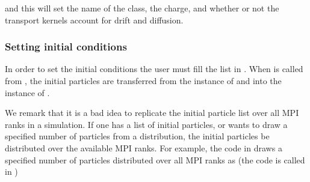 \documentclass[letterpaper,10pt,english]{sphinxmanual}
\begin{document}
and this will set the name of the class, the charge, and whether or not the transport kernels account for drift and diffusion.


\subsubsection{Setting initial conditions}
\label{\detokenize{Solvers/Ito:setting-initial-conditions}}
In order to set the initial conditions the user must fill the list  in .
When  is called from , the initial particles are transferred from the instance of  and into the instance of .

We remark that it is a bad idea to replicate the initial particle list over all MPI ranks in a simulation.
If one has a list of initial particles, or wants to draw a specified number of particles from a distribution, the initial particles  be distributed over the available MPI ranks.
For example, the code in  draws a specified number of particles distributed over all MPI ranks as (the code is called in )
\end{document}
